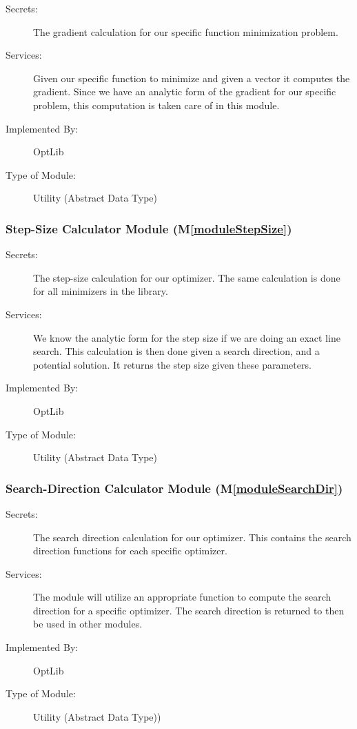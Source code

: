\documentclass[12pt, titlepage]{article}
\newcommand{\mref}[1]{M\ref{#1}}
\begin{document}
\begin{description}
\item[Secrets:]The gradient calculation for our specific function minimization problem.
\item[Services:]Given our specific function to minimize and given a vector it computes the gradient. Since we have an analytic form of the gradient for our specific problem, this computation is taken care of in this module.
\item[Implemented By:] OptLib
\item[Type of Module:] Utility (Abstract Data Type)
\end{description}

\subsubsection{Step-Size Calculator Module (\mref{moduleStepSize})}

\begin{description}
\item[Secrets:]The step-size calculation for our optimizer. The same calculation is done for all minimizers in the library.
\item[Services:]We know the analytic form for the step size if we are doing an exact line search. This calculation is then done given a search direction, and a potential solution. It returns the step size given these parameters.
\item[Implemented By:] OptLib
\item[Type of Module:] Utility (Abstract Data Type)
\end{description}

\subsubsection{Search-Direction Calculator Module (\mref{moduleSearchDir})}

\begin{description}
\item[Secrets:]The search direction calculation for our optimizer. This contains the search direction functions for each specific optimizer. 
\item[Services:]The module will utilize an appropriate function to compute the search direction for a specific optimizer. The search direction is returned to then be used in other modules.
\item[Implemented By:] OptLib 
\item[Type of Module:] Utility (Abstract Data Type))
\end{description}
\end{document}
